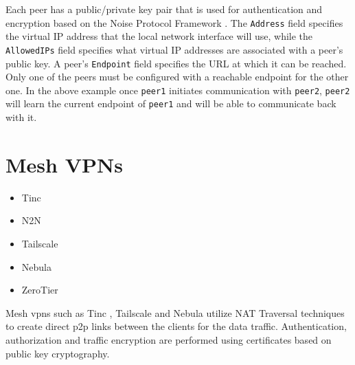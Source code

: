 Each peer has a public/private key pair that is used for authentication
and encryption based on the Noise Protocol Framework
\autocite{noiseDocs}. The \texttt{Address} field specifies the virtual
IP address that the local network interface will use, while the
\texttt{AllowedIPs} field specifies what virtual IP addresses are
associated with a peer's public key. A peer's \texttt{Endpoint} field
specifies the URL at which it can be reached. Only one of the peers must
be configured with a reachable endpoint for the other one. In the above
example once \texttt{peer1} initiates communication with \texttt{peer2},
\texttt{peer2} will learn the current endpoint of \texttt{peer1} and
will be able to communicate back with it.


\hypertarget{mesh-vpns}{%
\section{Mesh VPNs}\label{mesh-vpns}}

\begin{itemize}
\tightlist
\item
  Tinc
\item
  N2N
\item
  Tailscale
\item
  Nebula
\item
  ZeroTier
\end{itemize}

Mesh \glspl{vpn} such as Tinc \autocite{tincDocs}, Tailscale
\autocite{tailscaleDocs} and Nebula \autocite{nebulaDocs} utilize NAT
Traversal techniques to create direct \gls{p2p} links between the
clients for the data traffic. Authentication, authorization and traffic
encryption are performed using certificates based on public key
cryptography.

